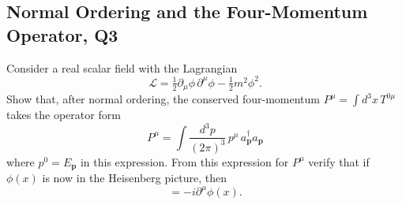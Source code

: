 \subsection{Normal Ordering and the Four-Momentum Operator, Q3}
Consider a real scalar field with the Lagrangian
\begin{equation}
    \mathcal{L} = \tfrac{1}{2}\partial_\mu\phi\,\partial^\mu\phi - \tfrac{1}{2}m^2\phi^2.
\end{equation}
Show that, after normal ordering, the conserved four-momentum $P^\mu = \int d^3x\, T^{0\mu}$ takes the operator form
\begin{equation}
    P^\mu = \int \frac{d^3p}{(2\pi)^3}\,p^\mu\, a_{\mathbf{p}}^\dagger a_{\mathbf{p}}
\end{equation}
where $p^0 = E_{\mathbf{p}}$ in this expression. From this expression for $P^\mu$ verify that if $\phi(x)$ is now in the Heisenberg picture, then
\begin{equation}
    [P^\mu, \phi(x)] = -i\partial^\mu\phi(x).
\end{equation}
